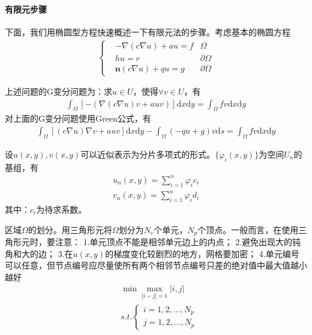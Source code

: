         \paragraph{有限元步骤}下面，我们用椭圆型方程快速概述一下有限元法的步骤。考虑基本的椭圆方程
        \begin{align*}
            \left\{
            \begin{aligned}
            &-\nabla (c\nabla u)+au = f & \Omega\\
            &hu = r & \partial \Omega \\
            &\mathbf{n}(c\nabla u) +qu = g & \partial \Omega
            \end{aligned}
            \right.
        \end{align*}
        \par
        上述问题的G变分问题为：求$u \in U$，使得$\forall v \in U$，有
        \begin{align*}
            \int _{\Omega} [- (\nabla(c\nabla u)v + auv)] \mathrm{d}x\mathrm{d}y = \int _{\Omega}fv\mathrm{d}x\mathrm{d}y
        \end{align*}
        对上面的G变分问题使用Green公式，有
        \begin{align*}
            \int _{\Omega} [ (c\nabla u)\nabla v + auv] \mathrm{d}x\mathrm{d}y - \int _{\Omega} (-qu+g)v\mathrm{d}s
             = \int _{\Omega}fv\mathrm{d}x\mathrm{d}y
        \end{align*}
        \par
        设$u(x,y),v(x,y)$可以近似表示为分片多项式的形式。$\{\varphi_i(x,y)\}$为空间$U_n$的基组，有
        \begin{align*}
            u_n(x,y) = \sum_{i = 1}^n \varphi_i c_i \\
            v_n(x,y) = \sum_{i = 1}^n \varphi_i d_i
        \end{align*}
        其中：$c_i$为待求系数。
        \par
        区域$\Omega$的划分。用三角形元将$\Omega$划分为$N_e$个单元，$N_p$个顶点。一般而言，在使用三角形元时，要注意：
        1.单元顶点不能是相邻单元边上的内点；
        2.避免出现大的钝角和大的边；
        3.在$u(x,y)$的梯度变化较剧烈的地方，网格要加密；
        4.单元编号可以任意，但节点编号应尽量使所有两个相邻节点编号只差的绝对值中最大值越小越好
        \begin{align*}
        &\min\max_{|i-j| = 1}|i,j|\\
        &s.t.
            \left\{
            \begin{aligned}
            i = 1,2,\dots,N_p\\
            j = 1,2,\dots,N_p
            \end{aligned}
            \right.
        \end{align*}
